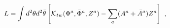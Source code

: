 \begin{equation}
\label{promezhsusy}
L=\int d^2\theta d^2{\bar \theta}
\left[
{\cal K}_{tw} (\Phi^{a}, {\bar \Phi}^{a}, Z^a)
- \sum_a (A^a + \bar A^a)Z^a \right]\ ,
   \end{equation}

